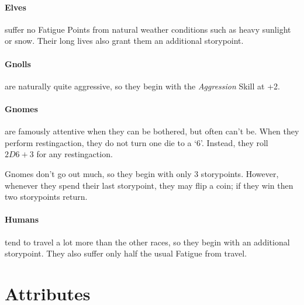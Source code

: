 \begin{multicols}{2}
{\paragraph{Elves}
suffer no Fatigue Points from natural weather conditions such as heavy sunlight or snow.
Their long lives also grant them an additional \gls{storypoint}.

\paragraph{Gnolls}
are naturally quite aggressive, so they begin with the \textit{Aggression} Skill at +2.

\paragraph{Gnomes}
are famously attentive when they can be bothered, but often can't be.
When they perform \gls{restingaction}, they do not turn one die to a `6'.
Instead, they roll $2D6+3$ for any \gls{restingaction}.

Gnomes don't go out much, so they begin with only 3 \glspl{storypoint}.
However, whenever they spend their last \gls{storypoint}, they may flip a coin; if they win then two \glspl{storypoint} return.

\paragraph{Humans}
tend to travel a lot more than the other races, so they begin with an additional \gls{storypoint}.
They also suffer only half the usual Fatigue from travel.

}

\end{multicols}

\section{Attributes}

